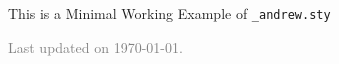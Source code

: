 \documentclass[11pt]{article}
\begin{document}
\maketitle

This is a Minimal Working Example of \verb+_andrew.sty+

\vfill

\hfill \textcolor{gray}{\small Last updated on \today.}
\newpage
\tableofcontents 
\newpage

\importfiles %
\end{document}
